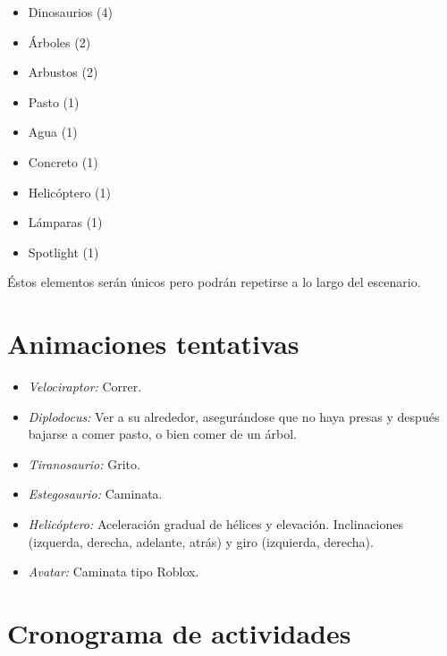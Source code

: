 \documentclass[12pt]{article} %
\begin{document}
	\begin{itemize}
		\item[\textbullet] Dinosaurios (4)
		\item[\textbullet] Árboles (2)
		\item[\textbullet] Arbustos (2)
		\item[\textbullet] Pasto (1)
		\item[\textbullet] Agua (1)
		\item[\textbullet] Concreto (1)
		\item[\textbullet] Helicóptero (1)
		\item[\textbullet] Lámparas (1)
		\item[\textbullet] Spotlight (1)
 	\end{itemize}
 	
 	Éstos elementos serán únicos pero podrán repetirse a lo largo del escenario.
 	
 	\section{Animaciones tentativas}
	
	\begin{itemize}
		\item[\textbullet] \emph{Velociraptor:} Correr.
		\item[\textbullet] \emph{Diplodocus:} Ver a su alrededor, asegurándose que no haya presas y después bajarse a comer pasto, 
					o bien comer de un árbol.
		\item[\textbullet] \emph{Tiranosaurio:} Grito.
		\item[\textbullet] \emph{Estegosaurio:} Caminata.
		\item[\textbullet] \emph{Helicóptero:} Aceleración gradual de hélices y elevación. 
				Inclinaciones (izquerda, derecha, adelante, atrás) y giro (izquierda, derecha).
		\item[\textbullet] \emph{Avatar:} Caminata tipo Roblox.
 	\end{itemize}
 	
 	\section{Cronograma de actividades}
 	
\end{document}
